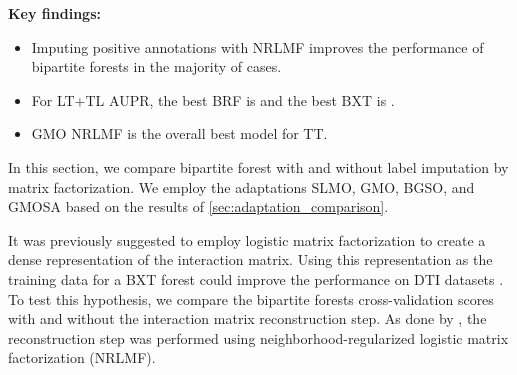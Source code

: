 \begin{mdframed}
    \textbf{Key findings:}
    \begin{itemize}
        \item Imputing positive annotations with NRLMF improves the performance of bipartite forests in the majority of cases.
        \item For LT+TL AUPR, the best BRF is  and the best BXT is .
        \item GMO NRLMF is the overall best model for TT.
    \end{itemize}
\end{mdframed}

In this section, we compare bipartite forest with and without label imputation by matrix factorization. We employ the adaptations SLMO, GMO, BGSO, and GMOSA based on the results of \autoref{sec:adaptation_comparison}.

It was previously suggested to employ logistic matrix factorization to create a dense representation of the interaction matrix. Using this representation as the training data for a BXT forest could improve the performance on DTI datasets \cite{pliakos2020drugtarget}.
To test this hypothesis, we compare the bipartite forests cross-validation scores with and without the interaction matrix reconstruction step. As done by \cite{pliakos2020drugtarget}, the reconstruction step was performed using neighborhood-regularized logistic matrix factorization (NRLMF)\cite{liu2016neighborhood}.

